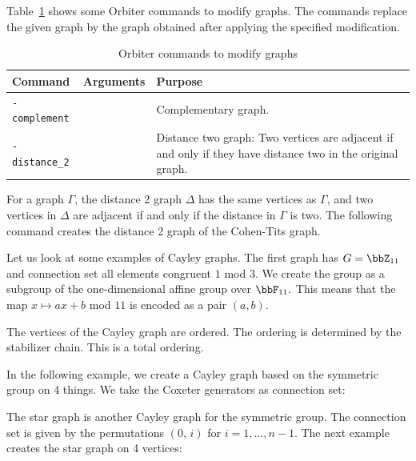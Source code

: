 \bigskip

Table~\ref{tab:graph:modifiers} shows some Orbiter commands to modify graphs.
The commands replace the given graph by the graph obtained after applying the specified modification.
\begin{table}
\begin{center}
\begin{tabular}{|p{4cm}|c|p{7cm}|}
\hline
Command & Arguments & Purpose \\
\hline
\hline
\verb'-complement' &  & Complementary graph. \\
\hline
\verb'-distance_2' &  & Distance two graph: Two vertices are adjacent 
if and only if they have distance two in the original graph. \\
\hline
\end{tabular}
\end{center}
\caption{\label{tab:graph:modifiers}Orbiter commands to modify graphs}
\end{table}

\bigskip


For a graph $\Gamma$, the distance 2 graph $\Delta$ has the same vertices as $\Gamma$, 
and two vertices in $\Delta$ are adjacent if and only if the distance in $\Gamma$ is two.
The following command creates the distance 2 graph of the Cohen-Tits graph. 
{\tt

}



\bigskip


Let us look at some examples of Cayley graphs. 
The first graph has $G = \bbZ_{11}$ 
and connection set all elements congruent $1$ mod $3$. We create the group as a subgroup of 
the one-dimensional affine group over $\bbF_{11}.$ 
This means that the map $x \mapsto ax+b$ mod $11$ is encoded as a pair $(a,b).$  
{\tt

}
The vertices of the Cayley graph are ordered. The ordering is determined by the stabilizer chain. 
This is a total ordering.

\bigskip

 
In the following example, we create a Cayley graph based on the symmetric group on 4 things. 
We take the Coxeter generators as connection set:
{\tt

}
The star graph is another Cayley graph for the symmetric group. 
The connection set is given by the permutations 
$(0,\,i)$ for $i=1,\ldots,n-1.$
The next example creates the star graph on 4 vertices:
{\tt

}




